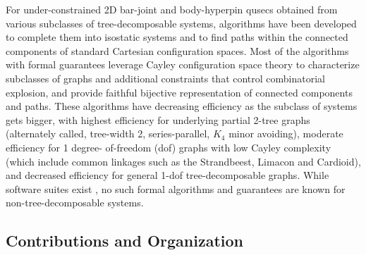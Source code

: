 \medskip\noindent
{}
For under-constrained 2D bar-joint and body-hyperpin qusecs obtained
from various subclasses of tree-decomposable systems, algorithms have
been developed to complete them into isostatic systems
\cite{joan-arinyo2003transforming,sitharam2005combinatorial,gao2006ctree,sitharam2010convex} and to find paths within the connected components
\cite{sitharam2011cayleyI,hidalgo2011reachability} of standard Cartesian configuration spaces.
Most of the
algorithms with formal guarantees leverage Cayley configuration space
theory \cite{sitharam2010convex,sitharam2011cayleyI,sitharam2011cayleyII} to characterize subclasses of graphs and
additional constraints that control combinatorial explosion, and
provide faithful bijective representation of connected components and
paths. These algorithms have decreasing efficiency as the subclass of
systems gets bigger, with highest efficiency for underlying partial
2-tree graphs (alternately called, tree-width 2, series-parallel, $K_4$
minor avoiding), moderate efficiency for 1 degree- of-freedom (dof)
graphs with low Cayley complexity (which include common linkages such
as the Strandbeest, Limacon and Cardioid), and decreased efficiency
for general 1-dof tree-decomposable graphs. While software suites
exist  \cite{keycurriculum1995geometer,porta2014open,siemens1999d,todd2007geometry}, no such formal algorithms and guarantees are known
for non-tree-decomposable systems.
%
\subsection{Contributions and Organization}
\label{sec:cont}


